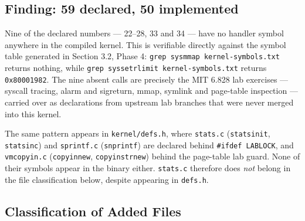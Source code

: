 \documentclass[11pt]{article}
\renewcommand{\_}{\origunderscore\allowbreak}
\begin{document}
\subsection*{Finding: 59 declared, 50 implemented}

Nine of the declared numbers --- 22--28, 33 and 34 --- have no handler symbol anywhere in the compiled kernel. This is verifiable directly against the symbol table generated in Section 3.2, Phase 4: \texttt{grep sys\_mmap kernel-symbols.txt} returns nothing, while \texttt{grep sys\_setrlimit kernel-symbols.txt} returns \texttt{0x80001982}. The nine absent calls are precisely the MIT 6.828 lab exercises --- syscall tracing, alarm and sigreturn, mmap, symlink and page-table inspection --- carried over as declarations from upstream lab branches that were never merged into this kernel.

The same pattern appears in \texttt{kernel/\allowbreak{}defs.h}, where \texttt{stats.c} (\texttt{statsinit}, \texttt{statsinc}) and \texttt{sprintf.c} (\texttt{snprintf}) are declared behind \texttt{\#ifdef LAB\_LOCK}, and \texttt{vmcopyin.c} (\texttt{copyin\_new}, \texttt{copyinstr\_new}) behind the page-table lab guard. None of their symbols appear in the binary either. \texttt{stats.c} therefore does \emph{not} belong in the file classification below, despite appearing in \texttt{defs.h}.

\subsection*{Classification of Added Files}
\end{document}
